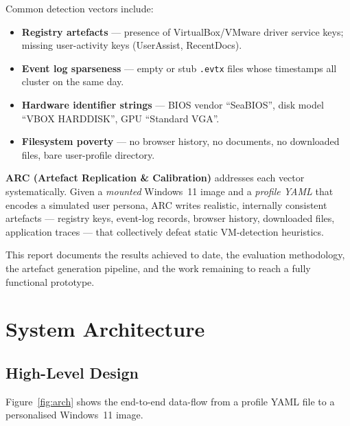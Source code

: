 \documentclass[12pt,a4paper]{article}
\begin{document}
Common detection vectors include:
\begin{itemize}[leftmargin=2em,noitemsep]
  \item \textbf{Registry artefacts} — presence of VirtualBox/VMware driver
        service keys; missing user-activity keys (UserAssist, RecentDocs).
  \item \textbf{Event log sparseness} — empty or stub \texttt{.evtx} files
        whose timestamps all cluster on the same day.
  \item \textbf{Hardware identifier strings} — BIOS vendor ``SeaBIOS'',
        disk model ``VBOX HARDDISK'', GPU ``Standard VGA''.
  \item \textbf{Filesystem poverty} — no browser history, no documents, no
        downloaded files, bare user-profile directory.
\end{itemize}

\textbf{ARC (Artefact Replication \& Calibration)} addresses each vector
systematically. Given a \emph{mounted} Windows~11 image and a
\emph{profile YAML} that encodes a simulated user persona, ARC writes
realistic, internally consistent artefacts — registry keys, event-log records,
browser history, downloaded files, application traces — that collectively
defeat static VM-detection heuristics.

This report documents the results achieved to date, the evaluation methodology,
the artefact generation pipeline, and the work remaining to reach a fully
functional prototype.

\section{System Architecture}
\label{sec:arch}

\subsection{High-Level Design}

Figure~\ref{fig:arch} shows the end-to-end data-flow from a profile YAML file
to a personalised Windows~11 image.
\end{document}
